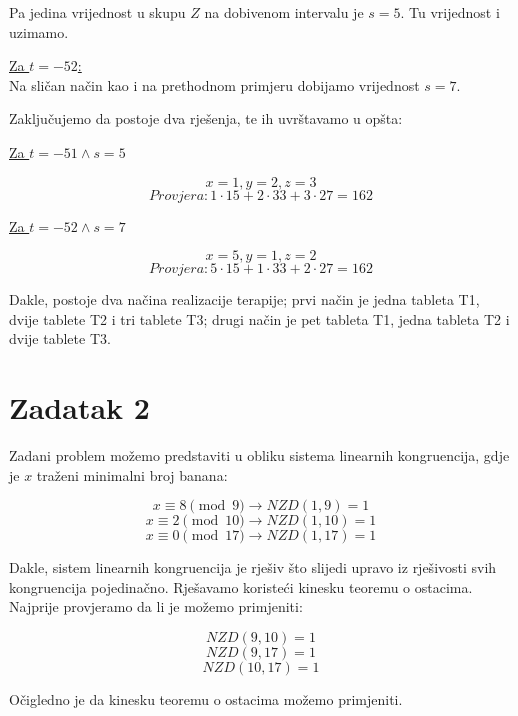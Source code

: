 \documentclass[12pt]{article}
\begin{document}
Pa jedina vrijednost u skupu $Z$ na dobivenom intervalu je $s = 5$. Tu vrijednost i uzimamo.\vspace{1mm}

\underline{Za $t = - 52$:}\\

Na sličan način kao i na prethodnom primjeru dobijamo vrijednost $s = 7$.\vspace{1mm}

Zaključujemo da postoje dva rješenja, te ih uvrštavamo u opšta:\vspace{1mm}

\underline{Za $t = - 51 \land s = 5$}\vspace{1mm}

$$x = 1, y = 2, z = 3$$
$$Provjera: 1 \cdot 15 + 2 \cdot 33 + 3 \cdot 27 = 162$$\vspace{1mm}

\underline{Za $t = - 52 \land s = 7$}

$$x = 5, y = 1, z = 2$$
$$Provjera: 5 \cdot 15 + 1 \cdot 33 + 2 \cdot 27 = 162$$\vspace{1mm}

Dakle, postoje dva načina realizacije terapije; prvi način je jedna tableta T1, dvije tablete T2 i tri tablete T3; drugi način je pet tableta T1, jedna tableta T2 i dvije tablete T3.

\newpage

\section*{Zadatak 2\label{Z2}}

\hspace{0.65cm}Zadani problem možemo predstaviti u obliku sistema linearnih kongruencija, gdje je $x$ traženi minimalni broj banana:

$$x \equiv 8 \pmod{9} \to NZD(1, 9) = 1$$
$$x \equiv 2 \pmod{10} \to NZD(1, 10) = 1$$
$$x \equiv 0 \pmod{17} \to NZD(1, 17) = 1$$\vspace{1mm}

Dakle, sistem linearnih kongruencija je rješiv što slijedi upravo iz rješivosti svih kongruencija pojedinačno. Rješavamo koristeći kinesku teoremu o ostacima. Najprije provjeramo da li je možemo primjeniti: 

$$NZD(9, 10) = 1$$
$$NZD(9, 17) = 1$$
$$NZD(10, 17) = 1$$\vspace{1mm}

Očigledno je da kinesku teoremu o ostacima možemo primjeniti.
\end{document}
